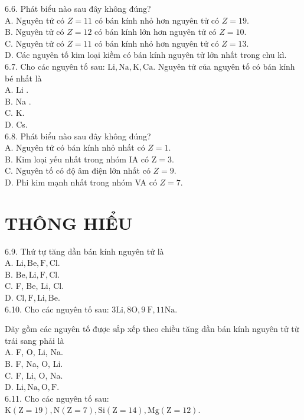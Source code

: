 \documentclass[10pt]{article}
\begin{document}
6.6. Phát biểu nào sau đây không đúng?\\
A. Nguyên tử có $Z=11$ có bán kính nhỏ hơn nguyên tử có $Z=19$.\\
B. Nguyên tử có $Z=12$ có bán kính lớn hơn nguyên tử có $Z=10$.\\
C. Nguyên tử có $Z=11$ có bán kính nhỏ hơn nguyên tử có $Z=13$.\\
D. Các nguyên tố kim loại kiềm có bán kính nguyên tử lớn nhất trong chu kì.\\
6.7. Cho các nguyên tố sau: $\mathrm{Li}, \mathrm{Na}, \mathrm{K}, \mathrm{Ca}$. Nguyên tử của nguyên tố có bán kính bé nhất là\\
A. Li .\\
B. Na .\\
C. K.\\
D. Cs.\\
6.8. Phát biểu nào sau đây không đúng?\\
A. Nguyên tử có bán kính nhỏ nhất có $Z=1$.\\
B. Kim loại yếu nhất trong nhóm IA có $\mathrm{Z}=3$.\\
C. Nguyên tố có độ âm điện lớn nhất có $Z=9$.\\
D. Phi kim mạnh nhất trong nhóm VA có $Z=7$.

\section*{THÔNG HIỂU}
6.9. Thứ tự tăng dần bán kính nguyên tử là\\
A. $\mathrm{Li}, \mathrm{Be}, \mathrm{F}, \mathrm{Cl}$.\\
B. $\mathrm{Be}, \mathrm{Li}, \mathrm{F}, \mathrm{Cl}$.\\
C. F, Be, Li, Cl.\\
D. $\mathrm{Cl}, \mathrm{F}, \mathrm{Li}, \mathrm{Be}$.\\
6.10. Cho các nguyên tố sau: $3 \mathrm{Li}, 8 \mathrm{O}, 9 \mathrm{~F}, 11 \mathrm{Na}$.

Dãy gồm các nguyên tố được sắp xếp theo chiều tăng dần bán kính nguyên tử từ trái sang phải là\\
A. F, O, Li, Na.\\
B. F, Na, O, Li.\\
C. F, Li, O, Na.\\
D. $\mathrm{Li}, \mathrm{Na}, \mathrm{O}, \mathrm{F}$.\\
6.11. Cho các nguyên tố sau: $\mathrm{K}(\mathrm{Z}=19), \mathrm{N}(\mathrm{Z}=7), \mathrm{Si}(\mathrm{Z}=14), \mathrm{Mg}(\mathrm{Z}=12)$.
\end{document}
